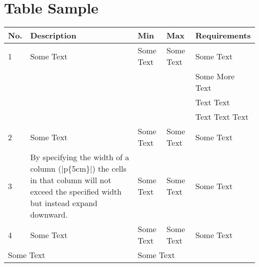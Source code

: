 \section{Table Sample}

\begin{table}[H]
\begin{tabular}{|l|p{5cm}|l|l|l|}
  \hline %
  \textbf{No.} &\textbf{Description} &\textbf{Min} &\textbf{Max} &\textbf{Requirements}    \\
  \hline %
  1            & Some Text           & Some Text   & Some Text   & Some Text               \\
               &                     &             &             & Some More Text          \\
               &                     &             &             & Text Text               \\
               &                     &             &             & Text Text Text          \\
  \hline %
  2            & Some Text           & Some Text   & Some Text   & Some Text               \\
  \hline %
  3            & By specifying the
                 width of a column
                 (|p\{5cm\}|) the
                 cells in that column
                 will not exceed the
                 specified width but         %
                 instead expand              %
                 downward.
                                     & Some Text           & Some Text   & Some Text       \\
  \hline %
  4            & Some Text           & Some Text   & Some Text   & Some Text               \\
  \hline %
  \multicolumn{2}{|l|}{Some Text}    & \multicolumn{3}{l|}{Some Text}                      \\
  \hline %

\end{tabular}
\end{table}
